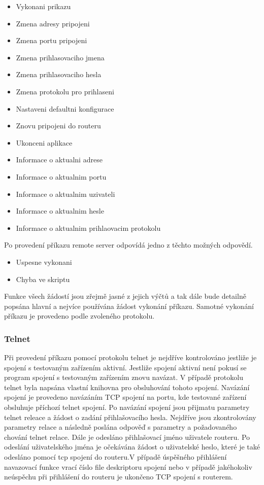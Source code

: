 \begin{itemize}
  \item Vykonani prikazu
  \item Zmena adresy pripojeni
  \item Zmena portu pripojeni
  \item Zmena prihlasovaciho jmena
  \item Zmena prihlasovaciho hesla
  \item Zmena protokolu pro prihlaseni
  \item Nastaveni defaultni konfigurace
  \item Znovu pripojeni do routeru
  \item Ukonceni aplikace
  \item Informace o aktualni adrese
  \item Informace o aktualnim portu
  \item Informace o aktualnim uzivateli
  \item Informace o aktualnim hesle
  \item Informace o aktualnim prihlaovacim protokolu
\end{itemize}

Po provedení příkazu remote server odpovídá jedno z těchto možných odpovědí.

\begin{itemize}
  \item Uspesne vykonani
  \item Chyba ve skriptu
\end{itemize}

Funkce všech žádostí jsou zřejmě jasné z jejich výčtů a tak dále bude detailně popsána hlavní a nejvíce používána žádost vykonání příkazu. Samotné vykonání příkazu je provedeno podle zvoleného protokolu.

\subsubsection{Telnet}
Při provedení příkazu pomocí protokolu telnet je nejdříve kontrolováno jestliže je spojení s testovaným zařízením aktivní. Jestliže spojení aktivní není pokusí se program spojení s testovaným zařízením znovu navázat. V případě protokolu telnet byla napsána vlastní knihovna pro obsluhování tohoto spojení. Navázání spojení je provedeno navázáním TCP spojení na portu, kde testované zařízení obsluhuje příchozí telnet spojení. Po navázání spojení jsou přijmatu parametry telnet releace a žádost o zadání přihlašovacího hesla. Nejdříve jsou zkontrolovány parametry relace a následně poslána odpověď s parametry a požadovaného chování telnet relace. Dále je odesláno přihlašovací jméno uživatele routeru. Po odeslání uživatelského jména je očekávána žádost o uživatelské heslo, které je také odesláno pomocí tcp spojení do routeru.V případě úspěšného přihlášení navazovací funkce vrací číslo file deskriptoru spojení nebo v případě jakéhokoliv neúspěchu při přihlášení do routeru je ukončeno TCP spojení s routerem.


